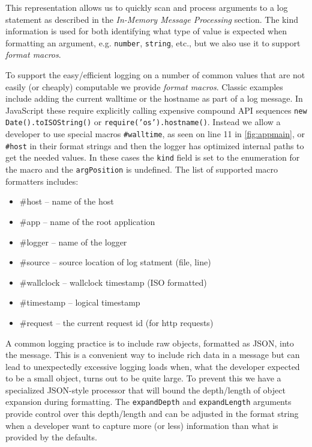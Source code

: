 This representation allows us to quickly scan and process arguments to a log statement as 
described in the \emph{In-Memory Message  Processing} section. The kind 
information is used for both identifying what type of value is expected 
when formatting an argument, e.g. \texttt{number}, \texttt{string}, etc., 
but we also use it to support \emph{format macros}.

To support the easy/efficient logging on a number of common values that 
are not easily (or cheaply) computable we provide \emph{format macros}. 
Classic examples include adding the current walltime or the hostname as 
part of a log message. In JavaScript these require explicitly calling 
expensive compound API sequences \texttt{new Date().toISOString()} or 
\texttt{require('os').hostname()}. Instead we allow a developer to use 
special macros \texttt{\#walltime}, as seen on line 11 in \autoref{fig:appmain}, 
or \texttt{\#host} in their format 
strings and then the logger has optimized internal paths to get the needed 
values. In these cases the \texttt{kind} field is set to the enumeration 
for the macro and the \texttt{argPosition} is undefined. The list of supported 
macro formatters includes:
\begin{itemize}
  \item \#host -- name of the host
  \item \#app -- name of the root application
  \item \#logger -- name of the logger
  \item \#source -- source location of log statment (file, line)
  \item \#wallclock -- wallclock timestamp (ISO formatted)
  \item \#timestamp -- logical timestamp
  \item \#request   -- the current request id (for http requests)
\end{itemize}

A common logging practice is to include raw objects, formatted as JSON, into the 
message. This is a convenient way to include rich data in a message but can 
lead to unexpectedly excessive logging loads when, what the developer expected to 
be a small object, turns out to be quite large. To prevent this we have a specialized 
JSON-style processor that will bound the depth/length of object expansion during 
formatting. The \texttt{expandDepth} and \texttt{expandLength} arguments provide 
control over this depth/length and can be adjusted in the format string when a 
developer want to capture more (or less) information than what is provided by the 
defaults.

